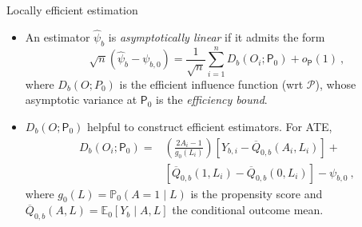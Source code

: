 \documentclass{beamer}
\begin{document}
\begin{frame}[c]{Locally efficient estimation}

\begin{center}
\begin{itemize}
  \itemsep6pt
  \item An estimator $\hat{\psi}_b$ is \textit{asymptotically linear} if it
    admits the form
    $$ \sqrt{n}(\hat{\psi}_b - \psi_{b,0}) = \frac{1}{\sqrt{n}}
      \sum_{i = 1}^{n} D_b(O_i; \mathsf{P}_0) + o_{\mathsf{P}}(1) \ , $$
      where $D_b(O; P_0)$ is the efficient influence function (wrt
      $\mathcal{P}$), whose asymptotic variance at $\mathsf{P}_0$ is the
      \textit{efficiency bound}.
  \item $D_b(O; \mathsf{P}_0)$ helpful to construct efficient estimators. For
    ATE,
    \begin{align*}
      D_b (O_i; \mathsf{P}_0) =& \left(\frac{2A_i - 1}{g_0(L_i)} \right)
      [Y_{b, i} - \overline{Q}_{0,b}(A_i, L_i)] + \\ 
      &[\overline{Q}_{0,b}(1, L_i) - \overline{Q}_{0,b}(0, L_i)] -
      \psi_{b, 0} \ ,
    \end{align*}
    where $g_0(L) = \mathbb{P}_0(A = 1 \mid L)$ is the propensity score
    and $\overline{Q}_{0,b}(A,L) = \mathbb{E}_0[Y_b \mid A, L]$ the conditional
    outcome mean.
\end{itemize}
\end{center}

\end{frame}

\end{document}

